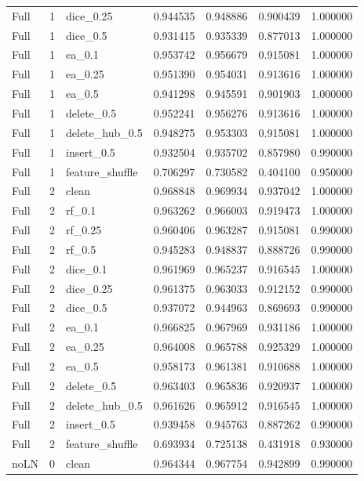 \documentclass[UTF8,a4paper,11pt,fontset=fandol]{ctexart}
\begin{document}
{\begin{longtable}{lrlrrrr}
Full & 1 & dice\_0.25 & 0.944535 & 0.948886 & 0.900439 & 1.000000 \\
Full & 1 & dice\_0.5 & 0.931415 & 0.935339 & 0.877013 & 1.000000 \\
Full & 1 & ea\_0.1 & 0.953742 & 0.956679 & 0.915081 & 1.000000 \\
Full & 1 & ea\_0.25 & 0.951390 & 0.954031 & 0.913616 & 1.000000 \\
Full & 1 & ea\_0.5 & 0.941298 & 0.945591 & 0.901903 & 1.000000 \\
Full & 1 & delete\_0.5 & 0.952241 & 0.956276 & 0.913616 & 1.000000 \\
Full & 1 & delete\_hub\_0.5 & 0.948275 & 0.953303 & 0.915081 & 1.000000 \\
Full & 1 & insert\_0.5 & 0.932504 & 0.935702 & 0.857980 & 0.990000 \\
Full & 1 & feature\_shuffle & 0.706297 & 0.730582 & 0.404100 & 0.950000 \\
Full & 2 & clean & 0.968848 & 0.969934 & 0.937042 & 1.000000 \\
Full & 2 & rf\_0.1 & 0.963262 & 0.966003 & 0.919473 & 1.000000 \\
Full & 2 & rf\_0.25 & 0.960406 & 0.963287 & 0.915081 & 0.990000 \\
Full & 2 & rf\_0.5 & 0.945283 & 0.948837 & 0.888726 & 0.990000 \\
Full & 2 & dice\_0.1 & 0.961969 & 0.965237 & 0.916545 & 1.000000 \\
Full & 2 & dice\_0.25 & 0.961375 & 0.963033 & 0.912152 & 0.990000 \\
Full & 2 & dice\_0.5 & 0.937072 & 0.944963 & 0.869693 & 0.990000 \\
Full & 2 & ea\_0.1 & 0.966825 & 0.967969 & 0.931186 & 1.000000 \\
Full & 2 & ea\_0.25 & 0.964008 & 0.965788 & 0.925329 & 1.000000 \\
Full & 2 & ea\_0.5 & 0.958173 & 0.961381 & 0.910688 & 1.000000 \\
Full & 2 & delete\_0.5 & 0.963403 & 0.965836 & 0.920937 & 1.000000 \\
Full & 2 & delete\_hub\_0.5 & 0.961626 & 0.965912 & 0.916545 & 1.000000 \\
Full & 2 & insert\_0.5 & 0.939458 & 0.945763 & 0.887262 & 0.990000 \\
Full & 2 & feature\_shuffle & 0.693934 & 0.725138 & 0.431918 & 0.930000 \\
noLN & 0 & clean & 0.964344 & 0.967754 & 0.942899 & 0.990000 \\

\end{longtable}}
\end{document}
